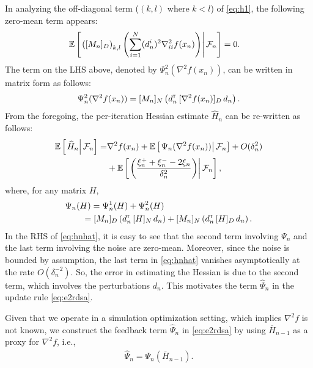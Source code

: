 \documentclass[twocolumn]{IEEEtran}
\begin{document}
In analyzing the off-diagonal term ($(k,l)$ where $k < l$) of \eqref{eq:h1}, the following zero-mean term appears:
\begin{align}
& \mathbb{E}\left[\left.\left([M_n]_{D}\right)_{k,l}   \left(\sum\limits_{i=1}^N (d_n^i)^2 \nabla^2_{ii} f(x_n)\right)\right| \mathcal{F}_n \right] = 0. 
\end{align}
The term on the LHS above, denoted by $\Psi_{n}^{2}(\nabla^2 f(x_n))$, can be written in matrix form as follows: 
\begin{align}\label{eq:ndmat}
\Psi_{n}^{2}(\nabla^2 f(x_n)) = [M_n]_{N}\left(d_{n}\tr \, [\nabla^2 f(x_n)]_{D} \, d_{n}\right).
\end{align}
From the foregoing, the per-iteration Hessian estimate $\widehat H_n$ can be re-written as follows:
\begin{align}
 \E\left[\left.\widehat H_n\right| \F_n\right] = & \nabla^2 f(x_n) + \E\left[\left.\Psi_{n}(\nabla^2 f(x_n))\right| \F_n\right]  +  O(\delta_n^2)\nonumber\\
&+\E\left[\left.\left(\dfrac{\xi_n^+ + \xi_n^- - 2 \xi_n}{\delta_n^2} \right)\right| \F_n\right], \label{eq:hnhat}
\end{align}
where, for any matrix $H$, 
\begin{align}
&\Psi_{n}(H) = \Psi_{n}^{1}(H) + \Psi_{n}^{2}(H)\nonumber\\
&\qquad= [M_n]_{D}\left(d_{n}\tr \, [H]_{N} \, d_{n}\right) +  [M_n]_{N}\left(d_{n}\tr \, [H]_{D} \, d_{n}\right).\label{eq:psi}
\end{align}
In the RHS of \eqref{eq:hnhat}, it is easy to see that  the second term involving $\Psi_{n}$ and the last term involving the noise are zero-mean. Moreover, since the noise is bounded by assumption, the last term in \eqref{eq:hnhat} vanishes asymptotically at the rate $O(\delta_n^{-2})$. So, the error in estimating the Hessian is due to the second term, which involves the perturbations $d_n$. This motivates the term $\widehat \Psi_n$ in the update rule \eqref{eq:e2rdsa}. 


Given that we operate in a simulation optimization setting, which implies $\nabla^2 f$ is not known, we construct the feedback term $\widehat \Psi_n$ in \eqref{eq:e2rdsa} by using $\overline H_{n-1}$ as a proxy for $\nabla^2 f$, i.e.,
\begin{align}
\widehat \Psi_n = \Psi_{n} (\overline H_{n-1}).
\end{align}
\end{document}
